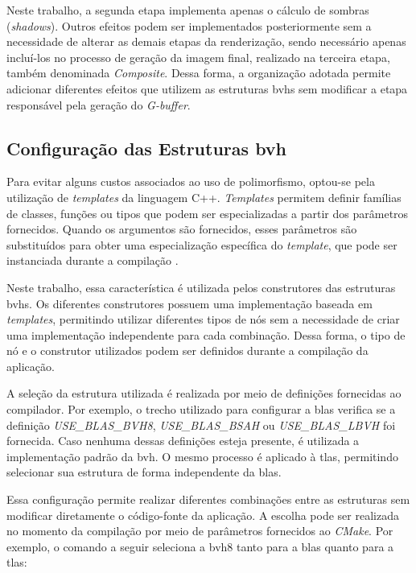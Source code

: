 Neste trabalho, a segunda etapa implementa apenas o cálculo de sombras (\textit{shadows}). Outros efeitos podem ser implementados posteriormente sem a necessidade de alterar as demais etapas da renderização, sendo necessário apenas incluí-los no processo de geração da imagem final, realizado na terceira etapa, também denominada \textit{Composite}. Dessa forma, a organização adotada permite adicionar diferentes efeitos que utilizem as estruturas \glspl{bvh} sem modificar a etapa responsável pela geração do \textit{G-buffer}.

\subsection{Configuração das Estruturas \gls{bvh}}

Para evitar alguns custos associados ao uso de polimorfismo, optou-se pela utilização de \textit{templates} da linguagem C++. \textit{Templates} permitem definir famílias de classes, funções ou tipos que podem ser especializadas a partir dos parâmetros fornecidos. Quando os argumentos são fornecidos, esses parâmetros são substituídos para obter uma especialização específica do \textit{template}, que pode ser instanciada durante a compilação \cite{cppreference_templates}.

Neste trabalho, essa característica é utilizada pelos construtores das estruturas \glspl{bvh}. Os diferentes construtores possuem uma implementação baseada em \textit{templates}, permitindo utilizar diferentes tipos de nós sem a necessidade de criar uma implementação independente para cada combinação. Dessa forma, o tipo de nó e o construtor utilizados podem ser definidos durante a compilação da aplicação.

A seleção da estrutura utilizada é realizada por meio de definições fornecidas ao compilador. Por exemplo, o trecho utilizado para configurar a \gls{blas} verifica se a definição \textit{USE\_BLAS\_BVH8}, \textit{USE\_BLAS\_BSAH} ou \textit{USE\_BLAS\_LBVH} foi fornecida. Caso nenhuma dessas definições esteja presente, é utilizada a implementação padrão da \gls{bvh}. O mesmo processo é aplicado à \gls{tlas}, permitindo selecionar sua estrutura de forma independente da \gls{blas}.

Essa configuração permite realizar diferentes combinações entre as estruturas sem modificar diretamente o código-fonte da aplicação. A escolha pode ser realizada no momento da compilação por meio de parâmetros fornecidos ao \textit{CMake}. Por exemplo, o comando a seguir seleciona a \gls{bvh8} tanto para a \gls{blas} quanto para a \gls{tlas}:

